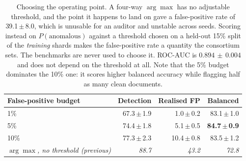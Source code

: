 \documentclass[11pt,a4paper]{article}
\begin{document}
\begin{table}[htbp]
\centering
\caption{Choosing the operating point. A four-way $\arg\max$ has no adjustable
threshold, and the point it happens to land on gave a false-positive rate of
39.1\,$\pm$\,8.0, which is unusable for an auditor and unstable across seeds. Scoring
instead on $P(\text{anomalous})$ against a threshold chosen on a held-out 15\%
split of the \emph{training} shards makes the false-positive rate a quantity the
consortium sets. The benchmarks are never used to choose it. ROC-AUC is
$0.894\,\pm\,0.004$ and does not depend on the threshold at all. Note that the
5\% budget dominates the 10\% one: it scores higher balanced accuracy while
flagging half as many clean documents.}
\label{tab:corpus_operating}
\small
\begin{tabular}{@{}l r r r@{}}
\toprule
\textbf{False-positive budget} & \textbf{Detection} & \textbf{Realised FP} &
\textbf{Balanced} \\
\midrule
1\%  & 67.3\,$\pm$\,1.9 &  1.0\,$\pm$\,0.2 & 83.1\,$\pm$\,1.0 \\
5\%  & 74.4\,$\pm$\,1.8 &  5.1\,$\pm$\,0.5 & \textbf{84.7\,$\pm$\,0.9} \\
10\% & 77.3\,$\pm$\,2.3 & 10.4\,$\pm$\,0.8 & 83.5\,$\pm$\,1.2 \\
\midrule
\textit{$\arg\max$, no threshold (previous)} & \textit{88.7} & \textit{43.2} &
  \textit{72.8} \\
\bottomrule
\end{tabular}
\end{table}
\end{document}
